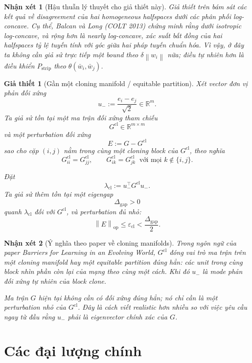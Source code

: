 \documentclass[11pt,a4paper]{article}
\newtheorem{assumption}{Giả thiết}
\newtheorem{remark}{Nhận xét}
\newcommand{\R}{\mathbb{R}}
\newcommand{\norm}[1]{\left\lVert #1 \right\rVert}
\DeclareMathOperator{\op}{op}
\begin{document}
\begin{remark}[Hậu thuẫn lý thuyết cho giả thiết này]
Giả thiết trên bám sát các kết quả về \emph{disagreement} của hai homogeneous
halfspaces dưới các phân phối log-concave. Cụ thể, Balcan và Long (COLT 2013)
chứng minh rằng dưới isotropic log-concave, và rộng hơn là nearly
log-concave, xác suất bất đồng của hai halfspaces tỷ lệ tuyến tính với góc
giữa hai pháp tuyến chuẩn hóa. Vì vậy, ở đây ta không cần giả sử trực tiếp
một bound theo $\delta \norm{w_i}$ nữa; điều tự nhiên hơn là điều khiển
$P_{\mathrm{strip}}$ theo $\theta(\bar w_i,\bar w_j)$.
\end{remark}

\begin{assumption}[Gần một cloning manifold / equitable partition]
\label{ass:clone_manifold}
Xét vector đơn vị phản đối xứng
\[
u_- := \frac{e_i - e_j}{\sqrt 2} \in \R^m.
\]
Ta giả sử tồn tại một ma trận đối xứng tham chiếu
\[
G^{\mathrm{cl}} \in \R^{m\times m}
\]
và một perturbation đối xứng
\[
E := G - G^{\mathrm{cl}}
\]
sao cho cặp $(i,j)$ nằm trong cùng một \emph{cloning block} của
$G^{\mathrm{cl}}$, theo nghĩa
\[
G^{\mathrm{cl}}_{ii} = G^{\mathrm{cl}}_{jj},
\qquad
G^{\mathrm{cl}}_{ik} = G^{\mathrm{cl}}_{jk}\ \text{ với mọi } k \notin \{i,j\}.
\]

Đặt
\[
\lambda_{\mathrm{cl}} := u_-^\top G^{\mathrm{cl}} u_-.
\]
Ta giả sử thêm tồn tại một eigengap
\[
\Delta_{\mathrm{gap}} > 0
\]
quanh $\lambda_{\mathrm{cl}}$ đối với $G^{\mathrm{cl}}$, và perturbation đủ nhỏ:
\[
\norm{E}_{\op} \le \varepsilon_{\mathrm{cl}} < \frac{\Delta_{\mathrm{gap}}}{2}.
\]
\end{assumption}

\begin{remark}[Ý nghĩa theo paper về cloning manifolds]
Trong ngôn ngữ của paper \emph{Barriers for Learning in an Evolving World},
$G^{\mathrm{cl}}$ đóng vai trò ma trận trên một cloning manifold hay một equitable
partition đúng hẳn: các unit trong cùng block nhìn phần còn lại của mạng theo
cùng một cách. Khi đó $u_-$ là mode phản đối xứng tự nhiên của block clone.

Ma trận $G$ hiện tại không cần có đối xứng đúng hẳn; nó chỉ cần là một
perturbation nhỏ của $G^{\mathrm{cl}}$. Đây là cách viết realistic hơn nhiều so
với việc yêu cầu ngay từ đầu rằng $u_-$ phải là eigenvector chính xác của $G$.
\end{remark}

\section{Các đại lượng chính}
\end{document}
